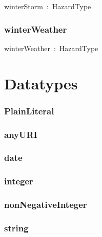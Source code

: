 \documentclass{article}
\begin{document}
winterStorm~:~HazardType

\subsubsection*{winterWeather}

winterWeather~:~HazardType

\section*{Datatypes}\subsubsection*{PlainLiteral}

\subsubsection*{anyURI}

\subsubsection*{date}

\subsubsection*{integer}

\subsubsection*{nonNegativeInteger}

\subsubsection*{string}
\end{document}
